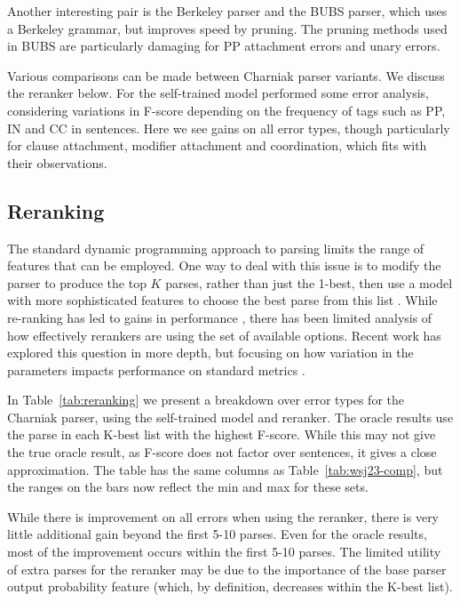 Another interesting pair is the Berkeley parser and the BUBS parser, which uses
a Berkeley grammar, but improves speed by pruning.  The pruning methods used in
BUBS are particularly damaging for PP attachment errors and unary errors.

Various comparisons can be made between Charniak parser variants.  We discuss
the reranker below.  For the self-trained model
\textcite{McClosky-Charniak-Johnson:2006} performed some error analysis,
considering variations in F-score depending on the frequency of tags such as
PP, IN and CC in sentences.  Here we see gains on all error types, though
particularly for clause attachment, modifier attachment and coordination, which
fits with their observations.

\subsection{Reranking}

The standard dynamic programming approach to parsing limits the range of
features that can be employed.  One way to deal with this issue is to modify
the parser to produce the top $K$ parses, rather than just the 1-best, then use
a model with more sophisticated features to choose the best parse from this
list \parencite{collins:00}.  While re-ranking has led to gains in performance
\parencite{Charniak-Johnson:2005}, there has been limited analysis of how
effectively rerankers are using the set of available options.  Recent work has
explored this question in more depth, but focusing on how variation in the
parameters impacts performance on standard metrics
\parencite{huang:08a,Ng-etal:2010,Auli-Lopez:2011,Ng-Curran:2012}.

In Table~\ref{tab:reranking} we present a breakdown over error types for the
Charniak parser, using the self-trained model and reranker.  The oracle results
use the parse in each K-best list with the highest F-score.  While this may not
give the true oracle result, as F-score does not factor over sentences, it
gives a close approximation.  The table has the same columns as
Table~\ref{tab:wsj23-comp}, but the ranges on the bars now reflect the min and
max for these sets.

While there is improvement on all errors when using the reranker, there is very
little additional gain beyond the first 5-10 parses.  Even for the oracle
results, most of the improvement occurs within the first 5-10 parses.  The
limited utility of extra parses for the reranker may be due to the importance
of the base parser output probability feature (which, by definition, decreases
within the K-best list).

